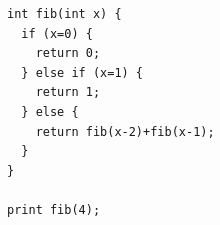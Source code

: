 \documentclass[dvipdfmx]{jarticle}
\begin{document}
\begin{Verbatim}
int fib(int x) {
  if (x=0) {
    return 0;
  } else if (x=1) {
    return 1;
  } else {
    return fib(x-2)+fib(x-1);
  }
}

print fib(4);
\end{Verbatim}
\end{document}
